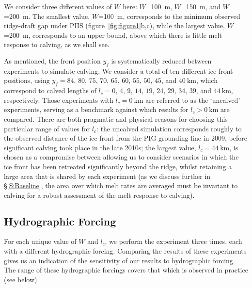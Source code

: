 \documentclass[draft]{agujournal2019}
\begin{document}
We consider three different values of $W$ here: $W$=100~m, $W$=150~m, and $W$=200~m. The smallest value, $W$=100~m, corresponds to the minimum observed ridge-draft gap under PIIS (figure~\ref{fig:figure1}b,c), while the largest value, $W$=200~m, corresponds to an upper bound, above which there is little melt response to calving, as we shall see. 

As mentioned, the front position $y_f$ is systematically reduced between experiments to simulate calving. We consider a total of ten different ice front positions, using $y_f=84$, $80$, $75$, $70$, $65$, $60$, $55$, $50$, $45$, and $40~\text{km}$, which correspond to calved lengths of $l_c=0$, $4$, $9$, $14$, $19$, $24$, $29$, $34$, $39$, and $44~\text{km}$, respectively. Those experiments with $l_c = 0~\text{km}$ are referred to as the `uncalved' experiments, serving as a benchmark against which results for $l_c >0~\text{km}$ are compared. There are both pragmatic and physical reasons for choosing this particular range of values for $l_c$: the uncalved simulation corresponds roughly to the observed distance of the ice front from the PIG grounding line in 2009, before significant calving took place in the late 2010s; the largest value, $l_c = 44~\text{km}$, is chosen as a compromise between allowing us to consider scenarios in which the ice front has been retreated significantly beyond the ridge, whilst retaining a large area that is shared by each experiment (as we discuss further in \S\ref{S:Baseline}, the area over which melt rates are averaged must be invariant to calving for a robust assessment of the melt response to calving). 


\subsection{Hydrographic Forcing}\label{S:Experiment:Hydrography}
For each unique value of $W$ and $l_c$, we perform the experiment three times, each with a different hydrographic forcing. Comparing the results of these experiments gives us an indication of the sensitivity of our results to hydrographic forcing. The range of these hydrographic forcings covers that which is observed in practice (see below).
\end{document}
